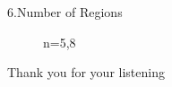 \documentclass{beamer}
\begin{document}
\begin{frame}{6.Number of Regions}
\begin{figure}
		\caption{n=5,8}
	\end{figure}
\end{frame}

\begin{tframe}
  Thank you for your listening
\end{tframe}
\end{document}
